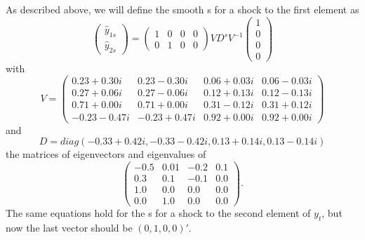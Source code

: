 \documentclass[12pt,fleqn]{article}
\begin{document}
As described above, we will define the smooth \IRF s for a shock to
the first element as
\begin{equation*}
  \begin{pmatrix}
    \hat y_{1s} \\ \hat y_{2s}
  \end{pmatrix}
  =
  \begin{pmatrix}
    1 & 0 & 0 & 0 \\ 0 & 1 & 0 & 0
  \end{pmatrix}
  V D^s V^{-1}
  \begin{pmatrix}
    1 \\ 0 \\ 0 \\ 0
  \end{pmatrix}
\end{equation*}
with
\begin{equation}
V = \begin{pmatrix}
     0.23 + 0.30 i & 0.23 - 0.30 i  & 0.06 + 0.03 i & 0.06 - 0.03 i \\
     0.27 + 0.06 i & 0.27 - 0.06 i  & 0.12 + 0.13 i & 0.12 - 0.13 i \\
     0.71 + 0.00 i & 0.71 + 0.00 i  & 0.31 - 0.12 i & 0.31 + 0.12 i \\
    -0.23 - 0.47 i & -0.23 + 0.47 i & 0.92 + 0.00 i & 0.92 + 0.00 i
  \end{pmatrix}
\end{equation}
and
\begin{equation}
  D = diag(-0.33 + 0.42 i, -0.33 - 0.42 i, 0.13 + 0.14 i, 0.13 - 0.14 i)
\end{equation}
the matrices of eigenvectors and eigenvalues of
\begin{equation*}
  \begin{pmatrix}
   -0.5            &  0.01          & -0.2          & 0.1          \\
    0.3            &  0.1           & -0.1          & 0.0          \\
    1.0            &  0.0           &  0.0          & 0.0          \\
    0.0            &  1.0           &  0.0          & 0.0
  \end{pmatrix}.
\end{equation*}
The same equations hold for the \IRF s for a shock to the second
element of $y_t$, but now the last vector should be $(0, 1, 0, 0)'$.
\end{document}
